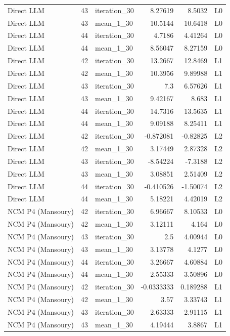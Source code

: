 \begin{table}[htbp!]
\begin{tabular}{lrlrrl}
Direct LLM & 43 & iteration\_30 & 8.27619 & 8.5032 & L0 \\
Direct LLM & 43 & mean\_1\_30 & 10.5144 & 10.6418 & L0 \\
Direct LLM & 44 & iteration\_30 & 4.7186 & 4.41264 & L0 \\
Direct LLM & 44 & mean\_1\_30 & 8.56047 & 8.27159 & L0 \\
Direct LLM & 42 & iteration\_30 & 13.2667 & 12.8469 & L1 \\
Direct LLM & 42 & mean\_1\_30 & 10.3956 & 9.89988 & L1 \\
Direct LLM & 43 & iteration\_30 & 7.3 & 6.57626 & L1 \\
Direct LLM & 43 & mean\_1\_30 & 9.42167 & 8.683 & L1 \\
Direct LLM & 44 & iteration\_30 & 14.7316 & 13.5635 & L1 \\
Direct LLM & 44 & mean\_1\_30 & 9.09188 & 8.25411 & L1 \\
Direct LLM & 42 & iteration\_30 & -0.872081 & -0.82825 & L2 \\
Direct LLM & 42 & mean\_1\_30 & 3.17449 & 2.87328 & L2 \\
Direct LLM & 43 & iteration\_30 & -8.54224 & -7.3188 & L2 \\
Direct LLM & 43 & mean\_1\_30 & 3.08851 & 2.51409 & L2 \\
Direct LLM & 44 & iteration\_30 & -0.410526 & -1.50074 & L2 \\
Direct LLM & 44 & mean\_1\_30 & 5.18221 & 4.42019 & L2 \\
NCM P4 (Mansoury) & 42 & iteration\_30 & 6.96667 & 8.10533 & L0 \\
NCM P4 (Mansoury) & 42 & mean\_1\_30 & 3.12111 & 4.164 & L0 \\
NCM P4 (Mansoury) & 43 & iteration\_30 & 2.5 & 4.00944 & L0 \\
NCM P4 (Mansoury) & 43 & mean\_1\_30 & 3.13778 & 4.1277 & L0 \\
NCM P4 (Mansoury) & 44 & iteration\_30 & 3.26667 & 4.60884 & L0 \\
NCM P4 (Mansoury) & 44 & mean\_1\_30 & 2.55333 & 3.50896 & L0 \\
NCM P4 (Mansoury) & 42 & iteration\_30 & -0.0333333 & 0.189288 & L1 \\
NCM P4 (Mansoury) & 42 & mean\_1\_30 & 3.57 & 3.33743 & L1 \\
NCM P4 (Mansoury) & 43 & iteration\_30 & 2.63333 & 2.91115 & L1 \\
NCM P4 (Mansoury) & 43 & mean\_1\_30 & 4.19444 & 3.8867 & L1 \\

\end{tabular}
\end{table}
